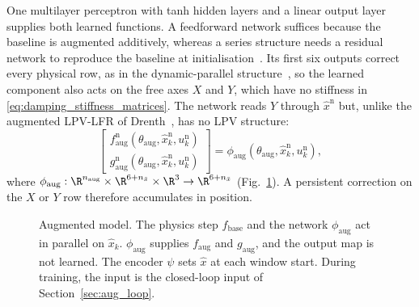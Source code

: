 One multilayer perceptron with tanh hidden layers and a linear output layer
supplies both learned functions.
A feedforward network suffices because the baseline is augmented additively,
whereas a series structure needs a residual network to reproduce the baseline
at initialisation~\cite[Sec.~4.3]{hoekstra2025lfr}.
Its first six outputs correct every physical row, as in the dynamic-parallel
structure~\cite[Sec.~2]{hoekstra2025lfr}, so the learned component also acts
on the free axes $X$ and $Y$, which have no stiffness in
\eqref{eq:damping_stiffness_matrices}.
The network reads $Y$ through $\hat x^{\mathrm n}$ but, unlike the augmented
LPV-LFR of Drenth~\cite[Eq.~(5.2)]{drenth2025thesis}, has no LPV structure:
\begin{equation}
 \begin{bmatrix}
  f^{\mathrm n}_{\mathrm{aug}}(\theta_{\mathrm{aug}},\hat x^{\mathrm n}_k,u^{\mathrm n}_k)\\
  g^{\mathrm n}_{\mathrm{aug}}(\theta_{\mathrm{aug}},\hat x^{\mathrm n}_k,u^{\mathrm n}_k)
 \end{bmatrix}
 =\phi_{\mathrm{aug}}(\theta_{\mathrm{aug}},\hat x^{\mathrm n}_k,u^{\mathrm n}_k),
 \label{eq:aug_network}
\end{equation}
where
$\phi_{\mathrm{aug}}:\R^{n_{\mathrm{aug}}}\times\R^{6+n_{\bar x}}\times\R^3\to\R^{6+n_{\bar x}}$
(Fig.~\ref{fig:aug_structure}).
A persistent correction on the $X$ or $Y$ row therefore accumulates in
position.

\begin{figure}[t]
 \centering
 \resizebox{\columnwidth}{!}{}
 \caption{Augmented model. The physics step $f_{\mathrm{base}}$ and the
 network $\phi_{\mathrm{aug}}$ act in parallel on $\hat x_k$.
 $\phi_{\mathrm{aug}}$ supplies $f_{\mathrm{aug}}$ and $g_{\mathrm{aug}}$,
 and the output map is not learned. The encoder
 $\psi$ sets $\hat x$ at each window start. During training, the input is the
 closed-loop input of Section~\ref{sec:aug_loop}.
 }
 \label{fig:aug_structure}
\end{figure}

